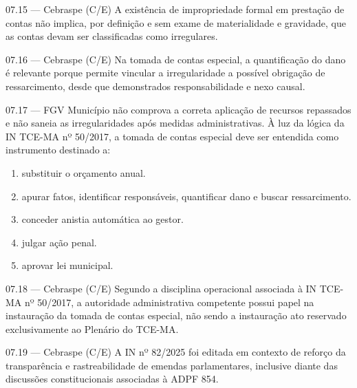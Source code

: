 \begin{questao}{ 07.15 — Cebraspe (C/E)}
A existência de impropriedade formal em prestação de contas não implica, por definição e sem exame de materialidade e gravidade, que as contas devam ser classificadas como irregulares.
\end{questao}

\begin{questao}{ 07.16 — Cebraspe (C/E)}
Na tomada de contas especial, a quantificação do dano é relevante porque permite vincular a irregularidade a possível obrigação de ressarcimento, desde que demonstrados responsabilidade e nexo causal.
\end{questao}

\begin{questao}{ 07.17 — FGV}
Município não comprova a correta aplicação de recursos repassados e não saneia as irregularidades após medidas administrativas. À luz da lógica da IN TCE-MA nº 50/2017, a tomada de contas especial deve ser entendida como instrumento destinado a:
\begin{enumerate}[label=\Alph*)]
\item substituir o orçamento anual.
\item apurar fatos, identificar responsáveis, quantificar dano e buscar ressarcimento.
\item conceder anistia automática ao gestor.
\item julgar ação penal.
\item aprovar lei municipal.
\end{enumerate}
\end{questao}

\begin{questao}{ 07.18 — Cebraspe (C/E)}
Segundo a disciplina operacional associada à IN TCE-MA nº 50/2017, a autoridade administrativa competente possui papel na instauração da tomada de contas especial, não sendo a instauração ato reservado exclusivamente ao Plenário do TCE-MA.
\end{questao}

\begin{questao}{ 07.19 — Cebraspe (C/E)}
A IN nº 82/2025 foi editada em contexto de reforço da transparência e rastreabilidade de emendas parlamentares, inclusive diante das discussões constitucionais associadas à ADPF 854.
\end{questao}

